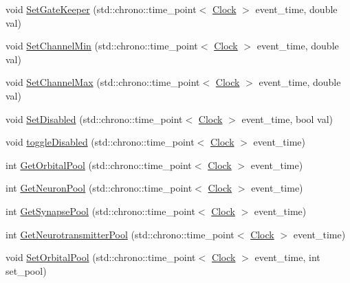 \begin{DoxyCompactItemize}
\item 
void \mbox{\hyperlink{classCognitiveNetwork_a83bc4047721417212fa1bbbfa64da5ee}{Set\+Gate\+Keeper}} (std\+::chrono\+::time\+\_\+point$<$ \mbox{\hyperlink{universe_8h_a0ef8d951d1ca5ab3cfaf7ab4c7a6fd80}{Clock}} $>$ event\+\_\+time, double val)
\item 
void \mbox{\hyperlink{classCognitiveNetwork_a6e2a6ced4ede9a4eef721d6c5aac433c}{Set\+Channel\+Min}} (std\+::chrono\+::time\+\_\+point$<$ \mbox{\hyperlink{universe_8h_a0ef8d951d1ca5ab3cfaf7ab4c7a6fd80}{Clock}} $>$ event\+\_\+time, double val)
\item 
void \mbox{\hyperlink{classCognitiveNetwork_a9c208d66ee284adfceb3b2dd76532a00}{Set\+Channel\+Max}} (std\+::chrono\+::time\+\_\+point$<$ \mbox{\hyperlink{universe_8h_a0ef8d951d1ca5ab3cfaf7ab4c7a6fd80}{Clock}} $>$ event\+\_\+time, double val)
\item 
void \mbox{\hyperlink{classCognitiveNetwork_ac29e676c84244f5b64c0083a0efead28}{Set\+Disabled}} (std\+::chrono\+::time\+\_\+point$<$ \mbox{\hyperlink{universe_8h_a0ef8d951d1ca5ab3cfaf7ab4c7a6fd80}{Clock}} $>$ event\+\_\+time, bool val)
\item 
void \mbox{\hyperlink{classCognitiveNetwork_abeac08d7cbf9df4b36de40aa9301e978}{toggle\+Disabled}} (std\+::chrono\+::time\+\_\+point$<$ \mbox{\hyperlink{universe_8h_a0ef8d951d1ca5ab3cfaf7ab4c7a6fd80}{Clock}} $>$ event\+\_\+time)
\item 
int \mbox{\hyperlink{classCognitiveNetwork_af5995eaa4ba35c555a6b65d895451f25}{Get\+Orbital\+Pool}} (std\+::chrono\+::time\+\_\+point$<$ \mbox{\hyperlink{universe_8h_a0ef8d951d1ca5ab3cfaf7ab4c7a6fd80}{Clock}} $>$ event\+\_\+time)
\item 
int \mbox{\hyperlink{classCognitiveNetwork_af81132245e486c496a055f54a5a520d0}{Get\+Neuron\+Pool}} (std\+::chrono\+::time\+\_\+point$<$ \mbox{\hyperlink{universe_8h_a0ef8d951d1ca5ab3cfaf7ab4c7a6fd80}{Clock}} $>$ event\+\_\+time)
\item 
int \mbox{\hyperlink{classCognitiveNetwork_ae0068b9df823e1b10fed3c73f1cb4702}{Get\+Synapse\+Pool}} (std\+::chrono\+::time\+\_\+point$<$ \mbox{\hyperlink{universe_8h_a0ef8d951d1ca5ab3cfaf7ab4c7a6fd80}{Clock}} $>$ event\+\_\+time)
\item 
int \mbox{\hyperlink{classCognitiveNetwork_a4e5b1d60cda4ddb4bd04d8dca42b7a5b}{Get\+Neurotransmitter\+Pool}} (std\+::chrono\+::time\+\_\+point$<$ \mbox{\hyperlink{universe_8h_a0ef8d951d1ca5ab3cfaf7ab4c7a6fd80}{Clock}} $>$ event\+\_\+time)
\item 
void \mbox{\hyperlink{classCognitiveNetwork_aeee6e2b2eb06b3c55a0f019b6c9cc250}{Set\+Orbital\+Pool}} (std\+::chrono\+::time\+\_\+point$<$ \mbox{\hyperlink{universe_8h_a0ef8d951d1ca5ab3cfaf7ab4c7a6fd80}{Clock}} $>$ event\+\_\+time, int set\+\_\+pool)

\end{DoxyCompactItemize}
